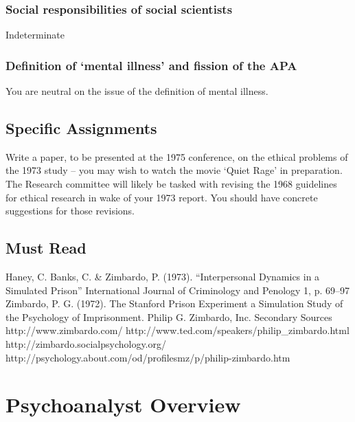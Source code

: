 \begin{refsection}
\subsubsection{Social responsibilities of social scientists}
\label{socialresponsibilitiesofsocialscientists}

Indeterminate

\subsubsection{Definition of ‘mental illness’ and fission of the APA}
\label{definitionof‘mentalillness’andfissionoftheapa}

You are neutral on the issue of the definition of mental illness.

\subsection{Specific Assignments}
\label{specificassignments}

Write a paper, to be presented at the 1975 conference, on the ethical problems of the 1973 study – you may wish to watch the movie `Quiet Rage' in preparation. The Research committee will likely be tasked with revising the 1968 guidelines for ethical research in wake of your 1973 report. You should have concrete suggestions for those revisions.

\subsection{Must Read}
\label{mustread}

Haney, C. Banks, C. \& Zimbardo, P. (1973). “Interpersonal Dynamics in a Simulated Prison” International Journal of Criminology and Penology 1, p. 69--97
Zimbardo, P. G. (1972). The Stanford Prison Experiment a Simulation Study of the Psychology of Imprisonment. Philip G. Zimbardo, Inc.
Secondary Sources
http:\slash \slash www.zimbardo.com\slash 
http:\slash \slash www.ted.com\slash speakers\slash philip\_zimbardo.html
http:\slash \slash zimbardo.socialpsychology.org\slash 
http:\slash \slash psychology.about.com\slash od\slash profilesmz\slash p\slash philip-zimbardo.htm

\pagebreak 

\section{Psychoanalyst Overview}
\label{psychoanalystoverview}


\end{refsection}
